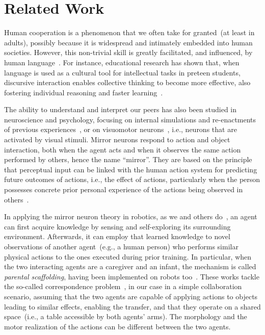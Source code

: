 
\section{Related Work}
\label{sec:related_work}

Human cooperation is a phenomenon that we often take for granted~(at least in adults), possibly because it is widespread and intimately embedded into human societies.
However, this non-trivial skill is greatly facilitated, and influenced, by human language~\cite{mueller:2000:psych}.
For instance, educational research has shown that, when language is used as a cultural tool for intellectual tasks in preteen students, discursive interaction enables collective thinking to become more effective, also fostering individual reasoning and faster learning~\cite{rojas:2003:ijer}.

The ability to understand and interpret our peers has also been studied in neuroscience and psychology, focusing on internal simulations and re-enactments of previous experiences~\cite{schillaci:2012:hbu,billing:2016:frobt}, or on visuomotor neurons~\cite{rizzolatti:2001:nrn}, i.e., neurons that are activated by visual stimuli.
Mirror neurons respond to action and object interaction, both when the agent acts and when it observes the same action performed by others, hence the name ``mirror''.
They are based on the principle that perceptual input can be linked with the human action system for predicting future outcomes of actions, i.e., the effect of actions, particularly when the person possesses concrete prior personal experience of the actions being observed in others~\cite{aglioti:2008:basketball,knoblich:2001:psychsci}.

In applying the mirror neuron theory in robotics, as we and others do~\cite{gazzola:2007:neuroimage,lopes:2009:ab}, an agent can first acquire knowledge by sensing and self-exploring its surrounding environment.
Afterwards, it can employ that learned knowledge to novel observations of another agent~(e.g., a human person) who performs similar physical actions to the ones executed during prior training.
In particular, when the two interacting agents are a caregiver and an infant, the mechanism is called \emph{parental scaffolding}, having been implemented on robots too~\cite{ugur:2015:robotica,ugur:2015:tamd}.
These works tackle the so-called correspondence problem~\cite{nehaniv:2002:correspondence}, in our case in a simple collaboration scenario, assuming that the two agents are capable of applying actions to objects leading to similar effects, enabling the transfer, and that they operate on a shared space~(i.e., a table accessible by both agents' arms).
The morphology and the motor realization of the actions can be different between the two agents.

